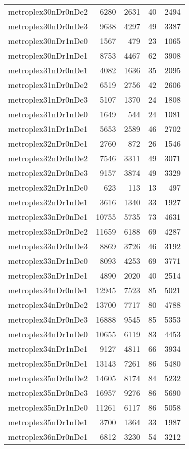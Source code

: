 \begin{longtable}{lrrrr}
metroplex30nDr0nDe2 & 6280 & 2631 & 40 & 2494 \\
metroplex30nDr0nDe3 & 9638 & 4297 & 49 & 3387 \\
metroplex30nDr1nDe0 & 1567 & 479 & 23 & 1065 \\
metroplex30nDr1nDe1 & 8753 & 4467 & 62 & 3908 \\
metroplex31nDr0nDe1 & 4082 & 1636 & 35 & 2095 \\
metroplex31nDr0nDe2 & 6519 & 2756 & 42 & 2606 \\
metroplex31nDr0nDe3 & 5107 & 1370 & 24 & 1808 \\
metroplex31nDr1nDe0 & 1649 & 544 & 24 & 1081 \\
metroplex31nDr1nDe1 & 5653 & 2589 & 46 & 2702 \\
metroplex32nDr0nDe1 & 2760 & 872 & 26 & 1546 \\
metroplex32nDr0nDe2 & 7546 & 3311 & 49 & 3071 \\
metroplex32nDr0nDe3 & 9157 & 3874 & 49 & 3329 \\
metroplex32nDr1nDe0 & 623 & 113 & 13 & 497 \\
metroplex32nDr1nDe1 & 3616 & 1340 & 33 & 1927 \\
metroplex33nDr0nDe1 & 10755 & 5735 & 73 & 4631 \\
metroplex33nDr0nDe2 & 11659 & 6188 & 69 & 4287 \\
metroplex33nDr0nDe3 & 8869 & 3726 & 46 & 3192 \\
metroplex33nDr1nDe0 & 8093 & 4253 & 69 & 3771 \\
metroplex33nDr1nDe1 & 4890 & 2020 & 40 & 2514 \\
metroplex34nDr0nDe1 & 12945 & 7523 & 85 & 5021 \\
metroplex34nDr0nDe2 & 13700 & 7717 & 80 & 4788 \\
metroplex34nDr0nDe3 & 16888 & 9545 & 85 & 5353 \\
metroplex34nDr1nDe0 & 10655 & 6119 & 83 & 4453 \\
metroplex34nDr1nDe1 & 9127 & 4811 & 66 & 3934 \\
metroplex35nDr0nDe1 & 13143 & 7261 & 86 & 5480 \\
metroplex35nDr0nDe2 & 14605 & 8174 & 84 & 5232 \\
metroplex35nDr0nDe3 & 16957 & 9276 & 86 & 5690 \\
metroplex35nDr1nDe0 & 11261 & 6117 & 86 & 5058 \\
metroplex35nDr1nDe1 & 3700 & 1364 & 33 & 1987 \\
metroplex36nDr0nDe1 & 6812 & 3230 & 54 & 3212 \\

\end{longtable}
